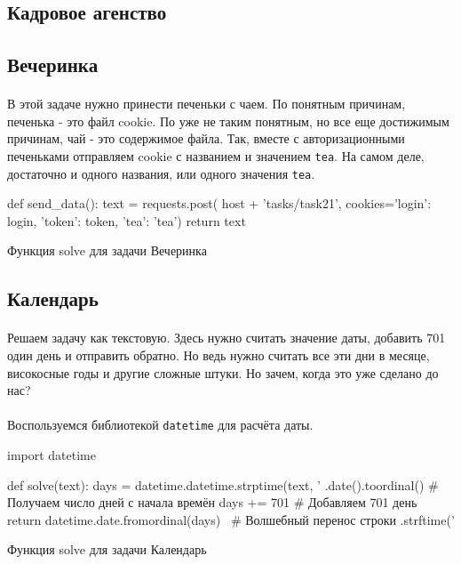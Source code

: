 \documentclass[12pt]{article}
\begin{document}
    \subsection{Кадровое агенство}


    \subsection{Вечеринка}
    \paragraph{}
    В этой задаче нужно принести печеньки с чаем.
    По понятным причинам, печенька - это файл cookie.
    По уже не таким понятным, но все еще достижимым причинам, чай - это содержимое файла.
    Так, вместе с авторизационными печеньками отправляем cookie с названием и значением \verb|tea|.
    На самом деле, достаточно и одного названия, или одного значения \verb|tea|.
    \begin{listing}[H]
        \begin{pythoncode}
def send_data():
    text = requests.post(
        host + 'tasks/task21',
        cookies={'login': login, 'token': token, 'tea': 'tea'})
    return text
        \end{pythoncode}
        \label{lst:solve21}
        \caption{Функция solve для задачи Вечеринка}
    \end{listing}

    \subsection{Календарь}
    \paragraph{}
    Решаем задачу как текстовую.
    Здесь нужно считать значение даты, добавить 701 один день и отправить обратно.
    Но ведь нужно считать все эти дни в месяце, високосные годы и другие сложные штуки.
    Но зачем, когда это уже сделано до нас?
    \paragraph{}
    Воспользуемся библиотекой \verb|datetime| для расчёта даты.
    \begin{listing}[H]
        \begin{pythoncode}
import datetime

def solve(text):
    days = datetime.datetime.strptime(text, '%
               .date().toordinal()                        # Получаем число дней с начала времён
    days += 701                                           # Добавляем 701 день
    return datetime.date.fromordinal(days) \              # Волшебный перенос строки
        .strftime('%
        \end{pythoncode}
        \label{lst:solve9}
        \caption{Функция solve для задачи Календарь}
    \end{listing}
\end{document}
